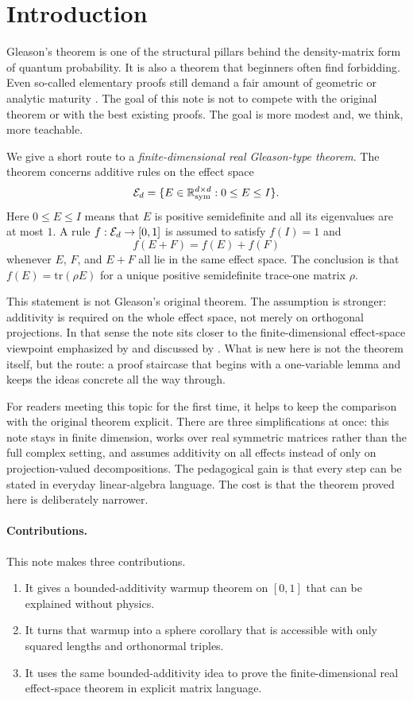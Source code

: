 \section{Introduction}

Gleason's theorem is one of the structural pillars behind the density-matrix form of quantum probability. It is also a theorem that beginners often find forbidding. Even so-called elementary proofs still demand a fair amount of geometric or analytic maturity \citep{cooke1985}. The goal of this note is not to compete with the original theorem or with the best existing proofs. The goal is more modest and, we think, more teachable.

We give a short route to a \emph{finite-dimensional real Gleason-type theorem}. The theorem concerns additive rules on the effect space
\[
\mathcal{E}_d=\{E \in \mathbb{R}^{d\times d}_{\mathrm{sym}} : 0 \leq E \leq I\}.
\]
Here $0 \leq E \leq I$ means that $E$ is positive semidefinite and all its eigenvalues are at most $1$. A rule $f:\mathcal{E}_d \to [0,1]$ is assumed to satisfy $f(I)=1$ and
\[
f(E+F)=f(E)+f(F)
\]
whenever $E$, $F$, and $E+F$ all lie in the same effect space. The conclusion is that $f(E)=\mathrm{tr}(\rho E)$ for a unique positive semidefinite trace-one matrix $\rho$.

This statement is not Gleason's original theorem. The assumption is stronger: additivity is required on the whole effect space, not merely on orthogonal projections. In that sense the note sits closer to the finite-dimensional effect-space viewpoint emphasized by \citet{busch2003} and discussed by \citet{wright2019}. What is new here is not the theorem itself, but the route: a proof staircase that begins with a one-variable lemma and keeps the ideas concrete all the way through.

For readers meeting this topic for the first time, it helps to keep the comparison with the original theorem explicit. There are three simplifications at once: this note stays in finite dimension, works over real symmetric matrices rather than the full complex setting, and assumes additivity on all effects instead of only on projection-valued decompositions. The pedagogical gain is that every step can be stated in everyday linear-algebra language. The cost is that the theorem proved here is deliberately narrower.

\paragraph{Contributions.}
This note makes three contributions.
\begin{enumerate}[leftmargin=1.4em]
  \item It gives a bounded-additivity warmup theorem on $[0,1]$ that can be explained without physics.
  \item It turns that warmup into a sphere corollary that is accessible with only squared lengths and orthonormal triples.
  \item It uses the same bounded-additivity idea to prove the finite-dimensional real effect-space theorem in explicit matrix language.
\end{enumerate}

